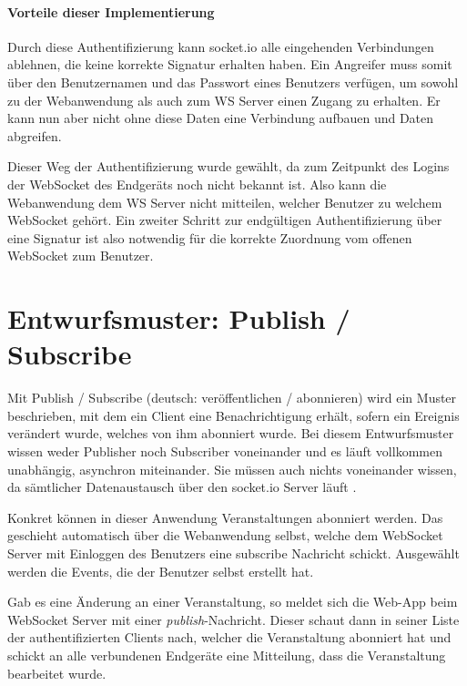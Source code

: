 \paragraph{Vorteile dieser Implementierung}
Durch diese Authentifizierung kann socket.io alle eingehenden Verbindungen ablehnen, die keine korrekte Signatur erhalten haben. Ein Angreifer muss somit über den Benutzernamen und das Passwort eines Benutzers verfügen, um sowohl zu der Webanwendung als auch zum WS Server einen Zugang zu erhalten. Er kann nun aber nicht ohne diese Daten eine Verbindung aufbauen und Daten abgreifen.\par

Dieser Weg der Authentifizierung wurde gewählt, da zum Zeitpunkt des Logins der WebSocket des Endgeräts noch nicht bekannt ist. Also kann die Webanwendung dem WS Server nicht mitteilen, welcher Benutzer zu welchem WebSocket gehört. Ein zweiter Schritt zur endgültigen Authentifizierung über eine Signatur ist also notwendig für die korrekte Zuordnung vom offenen WebSocket zum Benutzer. 


\section{Entwurfsmuster: Publish / Subscribe}
Mit Publish / Subscribe (deutsch: veröffentlichen / abonnieren) wird ein Muster beschrieben, mit dem ein Client eine Benachrichtigung erhält, sofern ein Ereignis verändert wurde, welches von ihm abonniert wurde. Bei diesem Entwurfsmuster wissen weder Publisher noch Subscriber voneinander und es läuft vollkommen unabhängig, asynchron miteinander. Sie müssen auch nichts voneinander wissen, da sämtlicher Datenaustausch über den socket.io Server läuft \cite{autobahn.js:pubsub}.\par

Konkret können in dieser Anwendung Veranstaltungen abonniert werden. Das geschieht automatisch über die Webanwendung selbst, welche dem WebSocket Server mit Einloggen des Benutzers eine subscribe Nachricht schickt. Ausgewählt werden die Events, die der Benutzer selbst erstellt hat. 

Gab es eine Änderung an einer Veranstaltung, so meldet sich die Web-App beim WebSocket Server mit einer \emph{publish}-Nachricht. Dieser schaut dann in seiner Liste der authentifizierten Clients nach, welcher die Veranstaltung abonniert hat und schickt an alle verbundenen Endgeräte eine Mitteilung, dass die Veranstaltung bearbeitet wurde.\par

